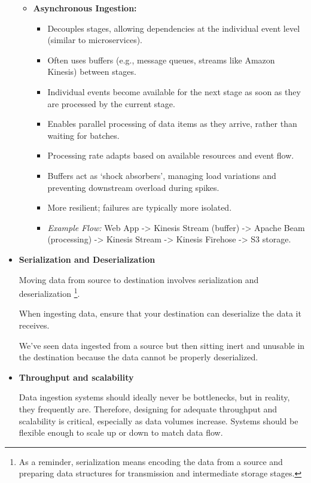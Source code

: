 \begin{itemize}
\begin{itemize}
        \item \textbf{Asynchronous Ingestion:}
            \begin{itemize}
                \item Decouples stages, allowing dependencies at the individual event level (similar to microservices).
                \item Often uses buffers (e.g., message queues, streams like Amazon Kinesis) between stages.
                \item Individual events become available for the next stage as soon as they are processed by the current stage.
                \item Enables parallel processing of data items as they arrive, rather than waiting for batches.
                \item Processing rate adapts based on available resources and event flow.
                \item Buffers act as `shock absorbers', managing load variations and preventing downstream overload during spikes.
                \item More resilient; failures are typically more isolated.
                \item \textit{Example Flow:} Web App -> Kinesis Stream (buffer) -> Apache Beam (processing) -> Kinesis Stream -> Kinesis Firehose -> S3 storage.
            \end{itemize}
    \end{itemize}


    \item \textbf{Serialization and Deserialization}
    
    \noindent
    Moving data from source to destination involves serialization
    and deserialization
    \footnote{
        As a reminder, serialization means encoding
        the data from a source and preparing data
        structures for transmission and intermediate
        storage stages.
    }.

    When ingesting data, ensure that your destination can
    deserialize the data it receives.
    
    We've seen data ingested from a source but then sitting inert
    and unusable in the destination because the data cannot be
    properly deserialized.


    \item \textbf{Throughput and scalability}
    
    \noindent
    Data ingestion systems should ideally never be bottlenecks,
    but in reality, they frequently are. Therefore, designing for
    adequate throughput and scalability is critical, especially as
    data volumes increase. Systems should be flexible enough to
    scale up or down to match data flow.
    

\end{itemize}
